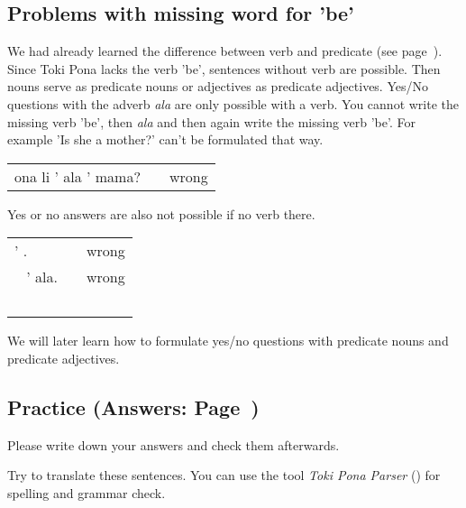 % 
\subsection*{Problems with missing word for 'be'}

We had already learned the difference between verb and predicate (see page~\pageref{'predicate'}). 
Since Toki Pona lacks the verb 'be', sentences without verb are possible. 
Then nouns serve as predicate nouns or adjectives as predicate adjectives. 
Yes/No questions with the adverb \textit{ala} are only possible with a verb. 
You cannot write the missing verb 'be', then \textit{ala} and then again write the missing verb 'be'.
For example 'Is she a mother?' can't be formulated that way. 

\begin{supertabular}{p{5,5cm}|ll}
ona li ' ala ' mama? && wrong \\ %
\end{supertabular} 

Yes or no answers are also not possible if no verb there. 

\begin{supertabular}{p{5,5cm}|ll}
' . && wrong \\\ %
' ala. && wrong \\\ %
\end{supertabular} 

We will later learn how to formulate yes/no questions with predicate nouns and predicate adjectives.
%
\newpage
\subsection*{Practice (Answers: Page~\pageref{'negation_yes_no_questions'})}
%
Please write down your answers and check them afterwards. 

Try to translate these sentences. 
You can use the tool \textit{Toki Pona Parser} (\cite{www:rowa:02}) for spelling and grammar check. 

